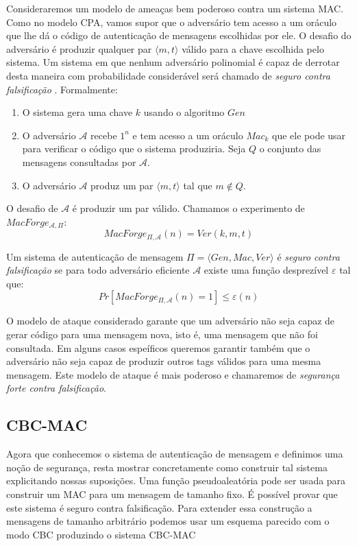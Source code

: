 Consideraremos um modelo de ameaças bem poderoso contra um sistema MAC.
Como no modelo CPA, vamos supor que o adversário tem acesso a um oráculo que lhe dá o código de autenticação de mensagens escolhidas por ele.
O desafio do adversário é produzir qualquer par $\langle m, t \rangle$ válido para a chave escolhida pelo sistema.
Um sistema em que nenhum adversário polinomial é capaz de derrotar desta maneira com probabilidade considerável será chamado de {\em seguro contra falsificação} \cite{Bellare00}.
Formalmente:
\begin{enumerate}
\item O sistema gera uma chave $k$ usando o algoritmo $Gen$
\item O adversário $\mathcal{A}$ recebe $1^n$ e tem acesso a um oráculo $Mac_k$ que ele pode usar para verificar o código que o sistema produziria. Seja $Q$ o conjunto das mensagens consultadas por $\mathcal{A}$.
\item O adversário $\mathcal{A}$ produz um par $\langle m, t \rangle$ tal que $m \notin Q$.
\end{enumerate}

O desafio de $\mathcal{A}$ é produzir um par válido.
Chamamos o experimento de $MacForge_{\mathcal{A}, \Pi}$:
\begin{displaymath}
  MacForge_{\Pi, \mathcal{A}}(n) = Ver(k, m, t)
\end{displaymath}

Um sistema de autenticação de mensagem $\Pi = \langle Gen, Mac, Ver \rangle$ é {\em seguro contra falsificação} se para todo adversário eficiente $\mathcal{A}$ existe uma função desprezível $\varepsilon$ tal que:
\begin{displaymath}
  Pr[MacForge_{\Pi, \mathcal{A}}(n) = 1] \leq \varepsilon(n)
\end{displaymath}

O modelo de ataque considerado garante que um adversário não seja capaz de gerar código para uma mensagem nova, isto é, uma mensagem que não foi consultada.
Em alguns casos espeíficos queremos garantir também que o adversário não seja capaz de produzir outros tags válidos para uma mesma mensagem.
Este modelo de ataque é mais poderoso e chamaremos de {\em segurança forte contra falsificação}.

\subsection{CBC-MAC}
\label{sec:cbc-mac}

Agora que conhecemos o sistema de autenticação de mensagem e definimos uma noção de segurança, resta mostrar concretamente como construir tal sistema explicitando nossas suposições.
Uma função pseudoaleatória pode ser usada para construir um MAC para um mensagem de tamanho fixo.
É possível provar que este sistema é seguro contra falsificação.
Para extender essa construção a mensagens de tamanho arbitrário podemos usar um esquema parecido com o modo CBC produzindo o sistema CBC-MAC 

